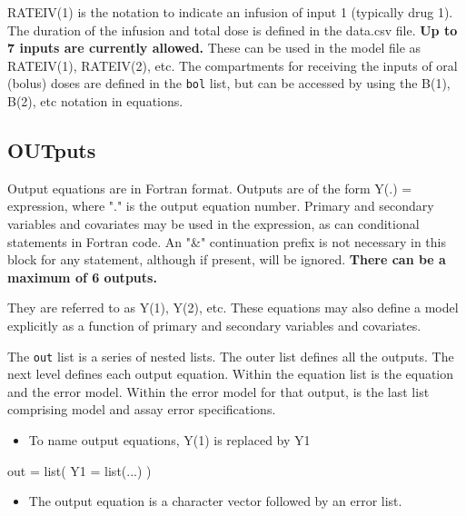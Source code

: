 \documentclass[
]{book}
\newenvironment{Shaded}{\begin{snugshade}}{\end{snugshade}}
\newcommand{\AttributeTok}[1]{\textcolor[rgb]{0.77,0.63,0.00}{#1}}
\newcommand{\FunctionTok}[1]{\textcolor[rgb]{0.00,0.00,0.00}{#1}}
\newcommand{\NormalTok}[1]{#1}
\newcommand{\OtherTok}[1]{\textcolor[rgb]{0.56,0.35,0.01}{#1}}
\providecommand{\tightlist}{%
  \setlength{\itemsep}{0pt}\setlength{\parskip}{0pt}}
\begin{document}
RATEIV(1) is the notation to indicate an infusion of input 1 (typically drug 1). The duration of the infusion and total dose is defined in the data.csv file. \textbf{Up to 7 inputs are currently
allowed.} These can be used in the model file as RATEIV(1), RATEIV(2), etc. The compartments for receiving the inputs of oral (bolus) doses are defined in the \texttt{bol} list, but can be accessed by using the B(1), B(2), etc notation in equations.

\hypertarget{outR6}{%
\subsection{OUTputs}\label{outR6}}

Output equations are in Fortran format. Outputs are of the form Y(.) =
expression, where "." is the output equation number. Primary and
secondary variables and covariates may be used in the expression, as can conditional statements in Fortran code. An "\&" continuation prefix is not necessary in this block for any statement, although if present, will be ignored. \textbf{There can be a maximum of 6 outputs.}

They are referred
to as Y(1), Y(2), etc. These equations may also define a model
explicitly as a function of primary and secondary variables and
covariates.

The \texttt{out} list is a series of nested lists. The outer list defines all the outputs. The next level defines each output equation. Within the equation list is the equation and the error model. Within the error model for that output, is the last list comprising model and assay error specifications.

\begin{itemize}
\tightlist
\item
  To name output equations, Y(1) is replaced by Y1
\end{itemize}

\begin{Shaded}
\begin{Highlighting}[]
\NormalTok{out }\OtherTok{=} \FunctionTok{list}\NormalTok{(}
  \AttributeTok{Y1 =} \FunctionTok{list}\NormalTok{(...)}
\NormalTok{)}
\end{Highlighting}
\end{Shaded}

\begin{itemize}
\tightlist
\item
  The output equation is a character vector followed by an error list.
\end{itemize}
\end{document}
